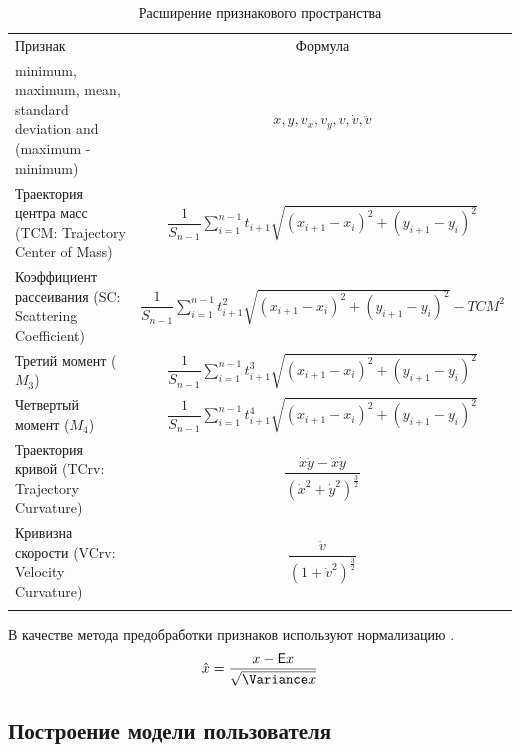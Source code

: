 \documentclass[12pt]{article}
\begin{document}
    \begin{table}[h]
        \centering
        \renewcommand{\arraystretch}{1.5}
        \renewcommand{\tabcolsep}{2mm}
        \caption{Расширение признакового пространства}
        \begin{tabular}{ || m{60mm} | c ||}
            \hhline{|t:==:t|} 
            Признак & Формула \\ [2mm]
            \hhline{|:==:|}
            minimum, maximum, mean, standard deviation and (maximum - minimum) & $x, y, v_x, v_y, v, \dot{v}, \ddot{v}$ \\
            \hhline{||-|-||}
            Траектория центра масс (TCM: Trajectory Center of Mass) & $ \dfrac{1}{S_{n-1}} \sum_{i=1}^{n-1} t_{i+1} \sqrt{(x_{i+1} - x_{i})^2 + (y_{i+1} - y_i)^2} $ \\
            \hhline{||-|-||}
            Коэффициент рассеивания (SC: Scattering Coefficient) &  $ \dfrac{1}{S_{n-1}} \sum_{i=1}^{n-1} t_{i+1}^2 \sqrt{(x_{i+1} - x_{i})^2 + (y_{i+1} - y_i)^2} - TCM^2 $ \\
            \hhline{||-|-||}
            Третий момент ($M_3$) & $ \dfrac{1}{S_{n-1}} \sum_{i=1}^{n-1} t_{i+1}^3 \sqrt{(x_{i+1} - x_{i})^2 + (y_{i+1} - y_i)^2} $ \\
            \hhline{||-|-||}
            Четвертый момент ($M_4$) & $ \dfrac{1}{S_{n-1}} \sum_{i=1}^{n-1} t_{i+1}^4 \sqrt{(x_{i+1} - x_{i})^2 + (y_{i+1} - y_i)^2} $ \\
            \hhline{||-|-||}
            Траектория кривой (TCrv: Trajectory Curvature) & $ \dfrac{\dot{x}\ddot{y} - \ddot{x}\dot{y}}{(\dot{x}^2 + \dot{y}^2)^\tfrac{3}{2}} $ \\
            \hhline{||-|-||}
            Кривизна скорости (VCrv: Velocity Curvature) & $ \dfrac{\ddot{v}}{(1 + \dot{v}^2)^\tfrac{3}{2}} $ \\
            \hhline{|b:==:b|}
        \end{tabular}
        \label{sec:Overview:Features:table:ArsFeaturesFormulas}
    \end{table}

    \par В качестве метода предобработки признаков используют нормализацию \cite{Kasprowski, Tan}.
    \begin{equation}
    \label{sec:PracticalPart:formula:StandartScaler}
        \hat{x}  = \frac{x - \mathsf{E}x}{\sqrt{\Variance x}}
    \end{equation}


    \subsection{Построение модели пользователя}
    \label{sec:Overview:Model}
\end{document}
